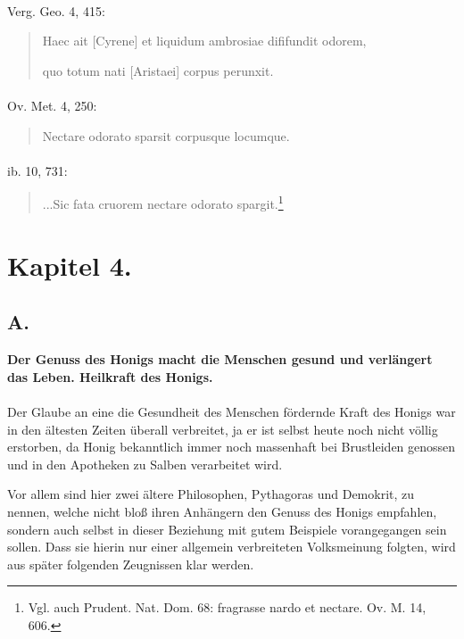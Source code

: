 \documentclass[a4paper, 11pt, oneside]{article}
\begin{document}
\paragraph{}
Verg. Geo. 4, 415:
\begin{quotation}
Haec ait [Cyrene] et liquidum ambrosiae dififundit odorem,

quo totum nati [Aristaei] corpus perunxit.
\end{quotation}
\paragraph{}
Ov. Met. 4, 250:
\begin{quotation}
Nectare odorato sparsit corpusque locumque.
\end{quotation}
\paragraph{}
ib. 10, 731:
\begin{quotation}
...Sic fata cruorem nectare odorato spargit.\footnote{Vgl. auch Prudent. Nat. Dom. 68: fragrasse nardo et nectare. Ov. M. 14, 606.}
\end{quotation}
\paragraph{}
\clearpage
\section{Kapitel 4.}
\subsection{A.}
\begin{center}
\textbf{Der Genuss des Honigs macht die Menschen gesund und verlängert das Leben. Heilkraft des Honigs.}
\end{center}
\paragraph{}
Der Glaube an eine die Gesundheit des Menschen fördernde Kraft des Honigs war in den ältesten Zeiten überall verbreitet, ja er ist selbst heute noch nicht völlig erstorben, da Honig bekanntlich immer noch massenhaft bei Brustleiden genossen und in den Apotheken zu Salben verarbeitet wird.

Vor allem sind hier zwei ältere Philosophen, Pythagoras und Demokrit, zu nennen, welche nicht bloß ihren Anhängern den Genuss des Honigs empfahlen, sondern auch selbst in dieser Beziehung mit gutem Beispiele vorangegangen sein sollen. Dass sie hierin nur einer allgemein verbreiteten Volksmeinung folgten, wird aus später folgenden Zeugnissen klar werden.
\end{document}
